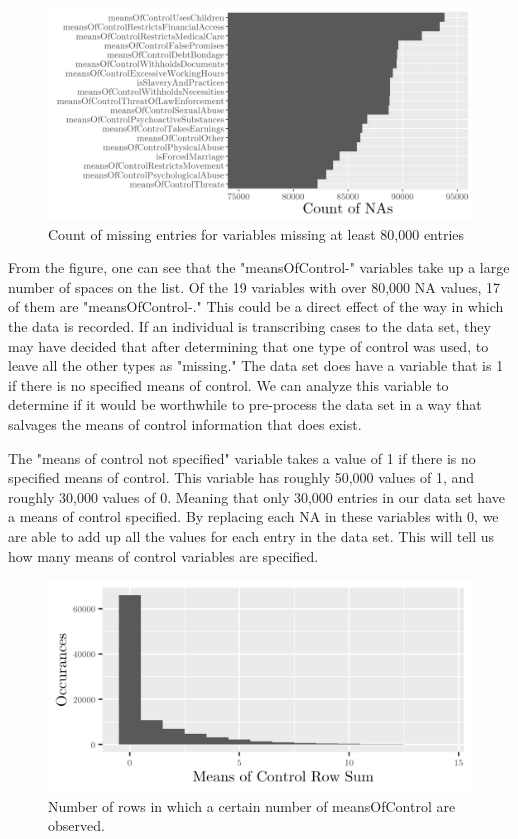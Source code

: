 \documentclass{article} %
\begin{document}
	\begin{figure}[H]
		\includegraphics[width = \textwidth]{NABarplot2}
		\caption{Count of missing entries for variables missing at least 80,000 entries}
		\label{fig:NABarplot2}
	\end{figure}
	
	From the figure, one can see that the "meansOfControl-" variables take up a large number of spaces on the list. Of the 19 variables with over 80,000 NA values, 17 of them are "meansOfControl-." This could be a direct effect of the way in which the data is recorded. If an individual is transcribing cases to the data set, they may have decided that after determining that one type of control was used, to leave all the other types as "missing." The data set does have a variable that is 1 if there is no specified means of control. We can analyze this variable to determine if it would be worthwhile to pre-process the data set in a way that salvages the means of control information that does exist.
	
	The "means of control not specified" variable takes a value of 1 if there is no specified means of control. This variable has roughly 50,000 values of 1, and roughly 30,000 values of 0. Meaning that only 30,000 entries in our data set have a means of control specified. By replacing each NA in these variables with 0, we are able to add up all the values for each entry in the data set. This will tell us how many means of control variables are specified.
	
	\begin{figure}[H]
		\includegraphics[width = \textwidth]{MeansOfControlSumHist}
		\caption{Number of rows in which a certain number of meansOfControl are observed.}
		\label{fig:MocRowSum}
	\end{figure}
	
\end{document}
